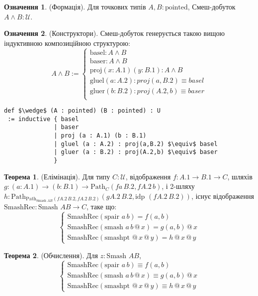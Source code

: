 \documentclass{article}
\theoremstyle{definition}
\newtheorem{theorem}{Теорема}
\newtheorem{definition}{Означення}
\begin{document}
\begin{definition} (Формація).
Для точкових типів \( A, B : \text{pointed} \), Смеш-добуток \( A \wedge B : \mathcal{U} \).
\end{definition}

\begin{definition} (Конструктори).
Смеш-добуток генерується такою вищою індуктивною композиційною структурою:
\[
A \wedge B :=
\begin{cases}
\text{basel} : A \wedge B \\
\text{baser} : A \wedge B \\
\text{proj} (x: A.1) (y: B.1) : A \wedge B \\
\text{gluel} (a: A.2) : proj(a,B.2) \equiv basel \\
\text{gluer} (b: B.2) : proj(A.2,b) \equiv baser \\
\end{cases}
\]
\begin{lstlisting}[mathescape=true]
def $\wedge$ (A : pointed) (B : pointed) : U
 := inductive { basel
              | baser
              | proj (a : A.1) (b : B.1)
              | gluel (a : A.2) : proj(a,B.2) $\equiv$ basel
              | gluer (a : B.2) : proj(A.2,b) $\equiv$ baser
              }
\end{lstlisting}
\end{definition}

\begin{theorem} (Елімінація).
Для типу \( C : \mathcal{U} \), відображення \( f : A.1 \to B.1 \to C \),
шляхів \( g : (a : A.1) \to (b : B.1) \to \text{Path}_C (f a \, B.2, f A.2 \, b) \),
і 2-шляху \( h : \text{Path}_{\text{Path}_{\text{Smash } A B} (f A.2 \, B.2, f A.2 \, B.2)} (g A.2 \, B.2, \text{idp } (f A.2 \, B.2)) \),
існує відображення \( \text{SmashRec} : \text{Smash } A B \to C \), таке що:
\[
\begin{cases}
\text{SmashRec}(\text{spair } a \, b) = f(a, b) \\
\text{SmashRec}(\text{smash } a \, b \, @ \, x) = g(a, b) \, @ \, x \\
\text{SmashRec}(\text{smashpt } @ \, x \, @ \, y) = h \, @ \, x \, @ \, y
\end{cases}
\]
\end{theorem}

\begin{theorem} (Обчислення).
Для \( z : \text{Smash } A B \),
\[
\begin{cases}
\text{SmashRec}(\text{spair } a \, b) \equiv f(a, b) \\
\text{SmashRec}(\text{smash } a \, b \, @ \, x) \equiv g(a, b) \, @ \, x \\
\text{SmashRec}(\text{smashpt } @ \, x \, @ \, y) \equiv h \, @ \, x \, @ \, y
\end{cases}
\]
\end{theorem}
\end{document}
